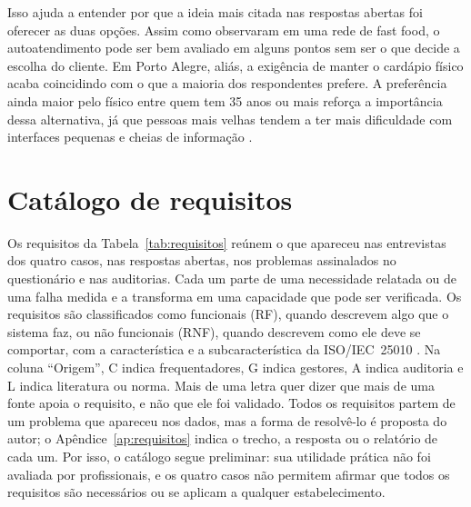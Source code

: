 Isso ajuda a entender por que a ideia mais citada nas respostas abertas foi oferecer as duas opções. Assim como  observaram em uma rede de fast food, o autoatendimento pode ser bem avaliado em alguns pontos sem ser o que decide a escolha do cliente. Em Porto Alegre, aliás, a exigência de manter o cardápio físico \cite{camarapoa2024cardapio} acaba coincidindo com o que a maioria dos respondentes prefere. A preferência ainda maior pelo físico entre quem tem 35 anos ou mais reforça a importância dessa alternativa, já que pessoas mais velhas tendem a ter mais dificuldade com interfaces pequenas e cheias de informação \cite{mclaughlin2020designing,lara2010acessibilidade}.

\section{Catálogo de requisitos}
\label{sec:disc-requisitos}

Os requisitos da Tabela~\ref{tab:requisitos} reúnem o que apareceu nas entrevistas dos quatro casos, nas respostas abertas, nos problemas assinalados no questionário e nas auditorias. Cada um parte de uma necessidade relatada ou de uma falha medida e a transforma em uma capacidade que pode ser verificada. Os requisitos são classificados como funcionais (RF), quando descrevem algo que o sistema faz, ou não funcionais (RNF), quando descrevem como ele deve se comportar, com a característica e a subcaracterística da ISO/IEC~25010 \cite{sommerville2016software,iso25010}. Na coluna ``Origem'', C indica frequentadores, G indica gestores, A indica auditoria e L indica literatura ou norma. Mais de uma letra quer dizer que mais de uma fonte apoia o requisito, e não que ele foi validado. Todos os requisitos partem de um problema que apareceu nos dados, mas a forma de resolvê-lo é proposta do autor; o Apêndice~\ref{ap:requisitos} indica o trecho, a resposta ou o relatório de cada um. Por isso, o catálogo segue preliminar: sua utilidade prática não foi avaliada por profissionais, e os quatro casos não permitem afirmar que todos os requisitos são necessários ou se aplicam a qualquer estabelecimento.

